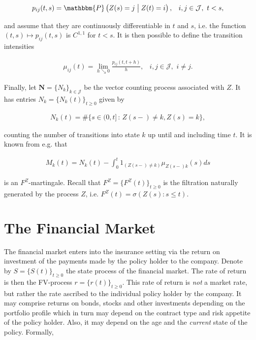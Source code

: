 \documentclass{book}
\newcommand{\1}[1]{\mathbbm{1}_{\left\lbrace #1 \right\rbrace}}
\theoremstyle{break}
\theoremstyle{remark}
\numberwithin{equation}{section}
\begin{document}
\begin{align*}
    p_{ij}(t,s) =  \mathbbm{P} \left( Z(s)=j \;\middle\vert\; Z(t)=i \right), \, \, \, \, \, i,j \in \mathcal{J}, \, \, t < s,
\end{align*}

and assume that they are continuously differentiable in $t$ and $s$, i.e. the function $(t,s) \mapsto p_{ij}(t,s)$ is $C^{1,1}$ for $t < s$. It is then possible to define the transition intensities

\begin{align*}
    \mu_{ij}(t) = \lim_{h \searrow 0} \frac{p_{ij} \left( t,t+h \right)}{h}, \, \, \, \, \, i,j \in \mathcal{J}, \, \, i \neq j.
\end{align*}

Finally, let $\textbf{N} = \{ N_{k} \}_{k \in \mathcal{J}}$ be the vector counting process associated with $Z$. It has entries $N_{k} = \{ N_{k}(t) \}_{t \geq 0}$ given by

\begin{align*}
    N_{k}(t) = \# \{ s \in (0,t] \, : \, Z(s-) \neq k, Z(s)=k \},
\end{align*}

counting the number of transitions into state $k$ up until and including time $t$. It is known from e.g. \cite{LivStok} that

\begin{align*}
    M_{k}(t) = N_{k}(t) - \int_0^t 1_{( Z(s-) \neq k)} \mu_{Z(s-)k}(s)ds
\end{align*}

is an $F^Z$-martingale. Recall that $F^Z= \{ F^Z(t) \}_{t \geq 0}$ is the filtration naturally generated by the process $Z$, i.e. $F^Z(t) = \sigma(Z(s) : s \leq t)$.

\section{The Financial Market}

The financial market enters into the insurance setting via the return on investment of the payments made by the policy holder to the company. Denote by $S = \{ S(t) \}_{t \geq 0}$ the state process of the financial market. The rate of return is then the FV-process $r = \{ r(t) \}_{t \geq 0}$. This rate of return is \textit{not} a market rate, but rather the rate ascribed to the individual policy holder by the company. It may comprise returns on bonds, stocks and other investments depending on the portfolio profile which in turn may depend on the contract type and risk appetite of the policy holder. Also, it may depend on the age and the \textit{current} state of the policy. Formally,
\end{document}
